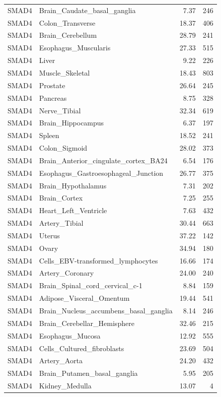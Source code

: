 \begin{footnotesize}
\begin{longtable}{llrr}
SMAD4 & Brain\_Caudate\_basal\_ganglia & 7.37 & 246 \\
SMAD4 & Colon\_Transverse & 18.37 & 406 \\
SMAD4 & Brain\_Cerebellum & 28.79 & 241 \\
SMAD4 & Esophagus\_Muscularis & 27.33 & 515 \\
SMAD4 & Liver & 9.22 & 226 \\
SMAD4 & Muscle\_Skeletal & 18.43 & 803 \\
SMAD4 & Prostate & 26.64 & 245 \\
SMAD4 & Pancreas & 8.75 & 328 \\
SMAD4 & Nerve\_Tibial & 32.34 & 619 \\
SMAD4 & Brain\_Hippocampus & 6.37 & 197 \\
SMAD4 & Spleen & 18.52 & 241 \\
SMAD4 & Colon\_Sigmoid & 28.02 & 373 \\
SMAD4 & Brain\_Anterior\_cingulate\_cortex\_BA24 & 6.54 & 176 \\
SMAD4 & Esophagus\_Gastroesophageal\_Junction & 26.77 & 375 \\
SMAD4 & Brain\_Hypothalamus & 7.31 & 202 \\
SMAD4 & Brain\_Cortex & 7.25 & 255 \\
SMAD4 & Heart\_Left\_Ventricle & 7.63 & 432 \\
SMAD4 & Artery\_Tibial & 30.44 & 663 \\
SMAD4 & Uterus & 37.22 & 142 \\
SMAD4 & Ovary & 34.94 & 180 \\
SMAD4 & Cells\_EBV-transformed\_lymphocytes & 16.66 & 174 \\
SMAD4 & Artery\_Coronary & 24.00 & 240 \\
SMAD4 & Brain\_Spinal\_cord\_cervical\_c-1 & 8.84 & 159 \\
SMAD4 & Adipose\_Visceral\_Omentum & 19.44 & 541 \\
SMAD4 & Brain\_Nucleus\_accumbens\_basal\_ganglia & 8.14 & 246 \\
SMAD4 & Brain\_Cerebellar\_Hemisphere & 32.46 & 215 \\
SMAD4 & Esophagus\_Mucosa & 12.92 & 555 \\
SMAD4 & Cells\_Cultured\_fibroblasts & 23.69 & 504 \\
SMAD4 & Artery\_Aorta & 24.20 & 432 \\
SMAD4 & Brain\_Putamen\_basal\_ganglia & 5.95 & 205 \\
SMAD4 & Kidney\_Medulla & 13.07 & 4 \\

\end{longtable}
\end{footnotesize}
